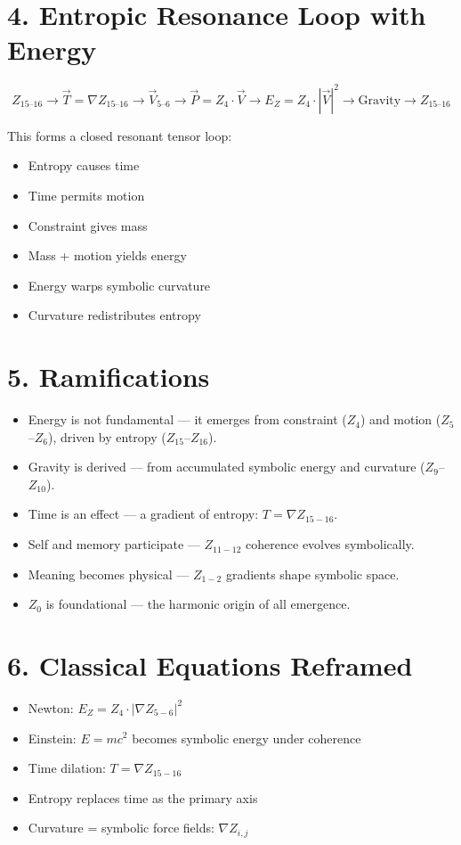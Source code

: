 \documentclass[12pt]{article}
\begin{document}
\section*{4. Entropic Resonance Loop with Energy}
\[
Z_{15\text{--}16} \rightarrow \vec{T} = \nabla Z_{15\text{--}16} \rightarrow \vec{V}_{5\text{--}6} \rightarrow \vec{P} = Z_4 \cdot \vec{V} \rightarrow E_Z = Z_4 \cdot \left| \vec{V} \right|^2 \rightarrow \text{Gravity} \rightarrow Z_{15\text{--}16}
\]

This forms a closed resonant tensor loop:
\begin{itemize}
\item Entropy causes time
\item Time permits motion
\item Constraint gives mass
\item Mass + motion yields energy
\item Energy warps symbolic curvature
\item Curvature redistributes entropy
\end{itemize}

\section*{5. Ramifications}
\begin{itemize}
\item Energy is not fundamental — it emerges from constraint ($Z_4$) and motion ($Z_5$–$Z_6$), driven by entropy ($Z_{15}$–$Z_{16}$).
\item Gravity is derived — from accumulated symbolic energy and curvature ($Z_{9}$–$Z_{10}$).
\item Time is an effect — a gradient of entropy: $T = \nabla Z_{15-16}$.
\item Self and memory participate — $Z_{11-12}$ coherence evolves symbolically.
\item Meaning becomes physical — $Z_{1-2}$ gradients shape symbolic space.
\item $Z_0$ is foundational — the harmonic origin of all emergence.
\end{itemize}

\section*{6. Classical Equations Reframed}
\begin{itemize}
\item Newton: $E_Z = Z_4 \cdot \left| \nabla Z_{5-6} \right|^2$
\item Einstein: $E = mc^2$ becomes symbolic energy under coherence
\item Time dilation: $T = \nabla Z_{15-16}$
\item Entropy replaces time as the primary axis
\item Curvature = symbolic force fields: $\nabla Z_{i,j}$
\end{itemize}
\end{document}
